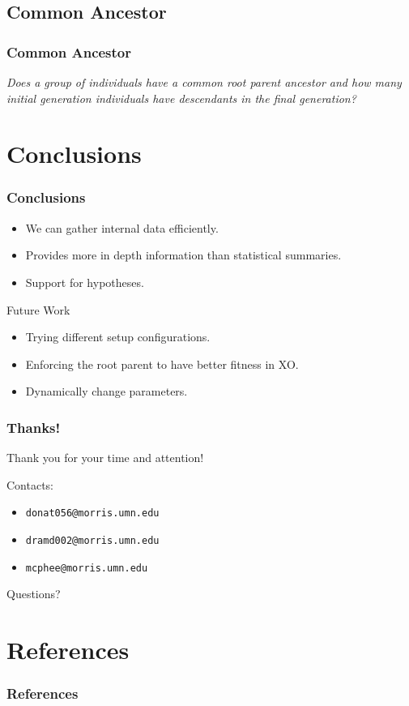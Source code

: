 \documentclass{beamer}
\newcommand{\linespace}{\vskip 0.25cm}
\begin{document}
\subsection[Common Ancestor]{Common Ancestor}

\begin{frame}
\frametitle{Common Ancestor}
\emph{Does a group of individuals have a common root parent ancestor and how many initial generation individuals have descendants in the final generation?}
\begin{center}
\end{center}

\end{frame}

\section[Conclusions]{Conclusions}

\begin{frame}
\frametitle{Conclusions}

\begin{itemize}
\item We can gather internal data efficiently.
\item Provides more in depth information than statistical summaries. 
\item Support for hypotheses.
\end{itemize}
\linespace
\linespace
\linespace
\linespace

Future Work
\begin{itemize}
\item Trying different setup configurations.
\item Enforcing the root parent to have better fitness in XO.
\item Dynamically change parameters.
\end{itemize}
\end{frame}

\begin{frame}
	\frametitle{Thanks!}
	
	Thank you for your time and attention!
		
	\linespace
	\linespace
	
	Contacts:  
	\begin{itemize}
		\item \texttt{donat056@morris.umn.edu}
		\item \texttt{dramd002@morris.umn.edu}
		\item \texttt{mcphee@morris.umn.edu}
	\end{itemize}
	
	\linespace
	\linespace
	
	\begin{center}
	{\huge Questions?}
	\end{center}
\end{frame}

\section*{References}

\begin{frame} 
\frametitle{References}
\nocite{*}

{\tiny }
\end{frame} 
\end{document}

